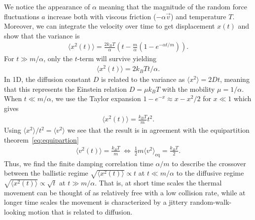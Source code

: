 We notice the appearance of $\alpha$ meaning that the magnitude of the random force
fluctuations $a$ increase both with viscous friction ($-\alpha \vec{v}$) and temperature $T$. Moreover, we can
integrate the velocity over time to get displacement $x(t)$ and show that the
variance is~\cite{stat_phys}
\begin{align*}
  \big\langle x^2(t) \big\rangle = \frac{2 k_B T}{\alpha} \left(t - \frac{m}{\alpha}\left(1 - e^{-\alpha t/m} \right) \right).
\end{align*}
For $t \gg m/\alpha$, only the $t$-term will survive yielding
\begin{align*}
  \langle x^2(t) \rangle = 2 k_BTt/\alpha.
\end{align*}
In 1D, the diffusion constant $D$ is related to the variance as $\langle x^2
\rangle = 2Dt$, meaning that this represents the Einstein relation $D = \mu k_B
T$ with the mobility $\mu = 1/\alpha$. When $t \ll m/\alpha$, we use the Taylor expansion $1 - e^{-x} \approx x - x^2/2$
for $x\ll 1$ which gives
\begin{align*}
  \big\langle x^2(t) \big\rangle = \frac{k_B T}{m} t^2.
\end{align*}
Using $\langle x^2 \rangle / t^2 = \langle v^2 \rangle$ we see that the result is in agreement with the equipartition theorem~\cref{eq:equipartion}
\begin{align*}
  \big\langle v^2(t) \big\rangle = \frac{k_B T}{m} \ \Longleftrightarrow \ \frac{1}{2}m\langle v^2 \rangle_{\text{eq}} = \frac{k_B T}{2}.
\end{align*}
Thus, we find the finite damping correlation time $\alpha/m$ to describe the crossover between the ballistic regime $\sqrt{\langle x^2(t)
\rangle} \propto t$ at $t \ll m/\alpha$ to the diffusive regime $\sqrt{\langle x^2(t)\rangle} \propto \sqrt{t}$ at $t \gg m/\alpha$. That is, at short time scales the thermal movement can be thought of as relatively free with a low collision rate, while at longer time scales the movement is characterized by a jittery random-walk-looking motion that is related to diffusion. 




